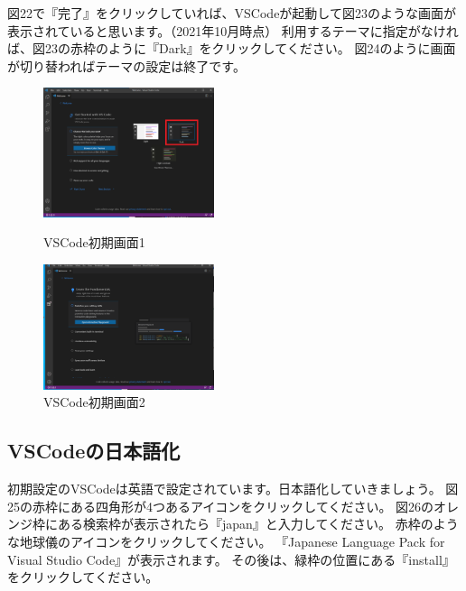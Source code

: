 \documentclass[dvipdfmx]{jsarticle}
\begin{document}
図22で『完了』をクリックしていれば、VSCodeが起動して図23のような画面が表示されていると思います。（2021年10月時点）
利用するテーマに指定がなければ、図23の赤枠のように『Dark』をクリックしてください。
図24のように画面が切り替わればテーマの設定は終了です。

\begin{figure}[H]
    \begin{minipage}[b]{0.45\linewidth}
        \centering
        \includegraphics[width=5cm]{images/VSCode1.png}
        \caption{VSCode初期画面1}
    \end{minipage}
    \begin{minipage}[b]{0.45\linewidth}
        \centering
        \includegraphics[width=5cm]{images/VSCode2.png}
        \caption{VSCode初期画面2}
    \end{minipage}
\end{figure}

\subsection{VSCodeの日本語化}

初期設定のVSCodeは英語で設定されています。日本語化していきましょう。
図25の赤枠にある四角形が4つあるアイコンをクリックしてください。
図26のオレンジ枠にある検索枠が表示されたら『japan』と入力してください。
赤枠のような地球儀のアイコンをクリックしてください。
『Japanese Language Pack for Visual Studio Code』が表示されます。
その後は、緑枠の位置にある『install』をクリックしてください。
\end{document}
